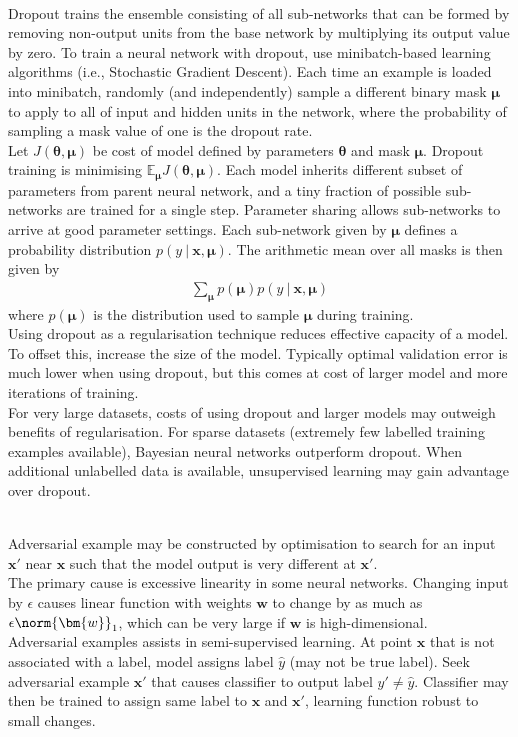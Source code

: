 \begin{remark} \\
Dropout trains the ensemble consisting of all sub-networks that can be formed by removing non-output units from the base network by multiplying its output value by zero. To train a neural network with dropout, use minibatch-based learning algorithms (i.e., Stochastic Gradient Descent). Each time an example is loaded into minibatch, randomly (and independently) sample a different binary mask $\bm{\mu}$ to apply to all of input and hidden units in the network, where the probability of sampling a mask value of one is the dropout rate.\\
Let $J(\bm{\theta}, \bm{\mu})$ be cost of model defined by parameters $\bm{\theta}$ and mask $\bm{\mu}$. Dropout training is minimising $\mathbb{E}_{\bm{\mu}}J(\bm{\theta}, \bm{\mu})$. Each model inherits different subset of parameters from parent neural network, and a tiny fraction of possible sub-networks are trained for a single step. Parameter sharing allows sub-networks to arrive at good parameter settings. Each sub-network given by $\bm{\mu}$ defines a probability distribution $p(y \ | \ \bm{x}, \bm{\mu})$. The arithmetic mean over all masks is then given by
\begin{align}
\sum\limits_{\bm{\mu}} p(\bm{\mu}) p(y \ | \ \bm{x}, \bm{\mu}) \nonumber
\end{align}
where $p(\bm{\mu})$ is the distribution used to sample $\bm{\mu}$ during training.\\
Using dropout as a regularisation technique reduces effective capacity of a model. To offset this, increase the size of the model. Typically optimal validation error is much lower when using dropout, but this comes at cost of larger model and more iterations of training.\\
For very large datasets, costs of using dropout and larger models may outweigh benefits of regularisation. For sparse datasets (extremely few labelled training examples available), Bayesian neural networks outperform dropout. When additional unlabelled data is available, unsupervised learning may gain advantage over dropout.
\end{remark}

\begin{remark} \\
Adversarial example may be constructed by optimisation to search for an input $\bm{x}'$ near $\bm{x}$ such that the model output is very different at $\bm{x}'$.\\
The primary cause is excessive linearity in some neural networks. Changing input by $\epsilon$ causes linear function with weights $\bm{w}$ to change by as much as $\epsilon \norm{\bm{w}}_1$, which can be very large if $\bm{w}$ is high-dimensional.\\
Adversarial examples assists in semi-supervised learning. At point $\bm{x}$ that is not associated with a label, model assigns label $\hat{y}$ (may not be true label). Seek adversarial example $\bm{x}'$ that causes classifier to output label $y' \neq \hat{y}$. Classifier may then be trained to assign same label to $\bm{x}$ and $\bm{x}'$, learning function robust to small changes.
\end{remark}

